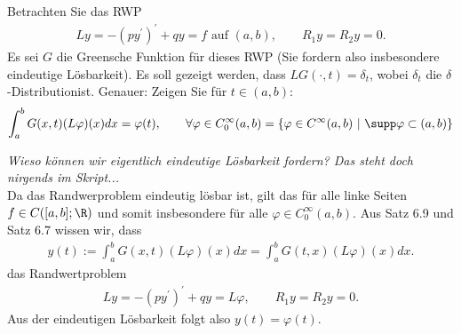 \begin{exercise}
Betrachten Sie das RWP
\begin{align*}
  Ly = -(py^{\prime})^{\prime} + qy = f \text{ auf } (a,b), \qquad R_1y = R_2y = 0.
\end{align*}
Es sei $G$ die Greensche Funktion für dieses RWP (Sie fordern also insbesondere
eindeutige Lösbarkeit). Es soll gezeigt werden, dass $LG(\cdot,t) = \delta_t$,
wobei $\delta_t$ die \glqq$\delta$-Distribution\grqq ist. Genauer: Zeigen Sie für
$t \in (a,b):$
\begin{align*}
  \int_a^b G(x,t)(L\varphi)(x) dx = \varphi(t), \qquad
  \forall \varphi \in C_0^{\infty}(a,b) = \{\varphi \in C^{\infty}(a,b) ~|~ \supp \varphi \subset (a,b)\}
\end{align*}
\end{exercise}
\begin{solution}
\textit{Wieso können wir eigentlich eindeutige Lösbarkeit fordern? Das steht doch nirgends im Skript...}\\
Da das Randwerproblem eindeutig lösbar ist, gilt das für alle linke Seiten $f \in C([a,b];\R)$
und somit insbesondere für alle $\varphi \in C_0^{\infty}(a,b)$. Aus Satz 6.9 und Satz 6.7 wissen wir, dass
\begin{align*}
  y(t) := \int_a^b G(x,t)(L\varphi)(x) dx = \int_a^b G(t,x)(L\varphi)(x) dx.
\end{align*}
das Randwertproblem
\begin{align*}
  Ly = -(py^{\prime})^{\prime} + qy = L\varphi, \qquad R_1y = R_2y = 0.
\end{align*}
Aus der eindeutigen Lösbarkeit folgt also $y(t) = \varphi(t)$.
\end{solution}
